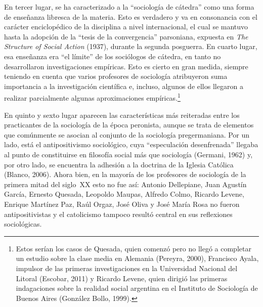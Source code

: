 En tercer lugar, se ha caracterizado a la ``sociología de cátedra'' como una forma de enseñanza libresca de la materia. Esto es verdadero y va en consonancia con el carácter enciclopédico de la disciplina a nivel internacional, el cual se mantuvo hasta la adopción de la ``tesis de la convergencia'' parsoniana, expuesta en \emph{The Structure of Social Action} (1937), durante la segunda posguerra. En cuarto lugar, esa enseñanza era ``el límite'' de los sociólogos de cátedra, en tanto no desarrollaron investigaciones empíricas. Esto es cierto en gran medida, siempre teniendo en cuenta que varios profesores de sociología atribuyeron suma importancia a la investigación científica e, incluso, algunos de ellos llegaron a realizar parcialmente algunas aproximaciones empíricas.\footnote{Estos serían los casos de Quesada, quien comenzó pero no llegó a completar un estudio sobre la clase media en Alemania (Pereyra, 2000), Francisco Ayala, impulsor de las primeras investigaciones en la Universidad Nacional del Litoral (Escobar, 2011) y Ricardo Levene, quien dirigió las primeras indagaciones sobre la realidad social argentina en el Instituto de Sociología de Buenos Aires (González Bollo, 1999).}

En quinto y sexto lugar aparecen las características más reiteradas entre los practicantes de la sociología de la época peronista, aunque se trata de elementos que comúnmente se asocian al conjunto de la sociología pregermaniana. Por un lado, está el antipositivismo sociológico, cuya ``especulación desenfrenada'' llegaba al punto de constituirse en filosofía social más que sociología (Germani, 1962) y, por otro lado, se encuentra la adhesión a la doctrina de la Iglesia Católica (Blanco, 2006). Ahora bien, en la mayoría de los profesores de sociología de la primera mitad del siglo~XX esto no fue así: Antonio Dellepiane, Juan Agustín García, Ernesto Quesada, Leopoldo Maupas, Alfredo Colmo, Ricardo Levene, Enrique Martínez Paz, Raúl Orgaz, José Oliva y José María Rosa no fueron antipositivistas y el catolicismo tampoco resultó central en sus reflexiones sociológicas.


